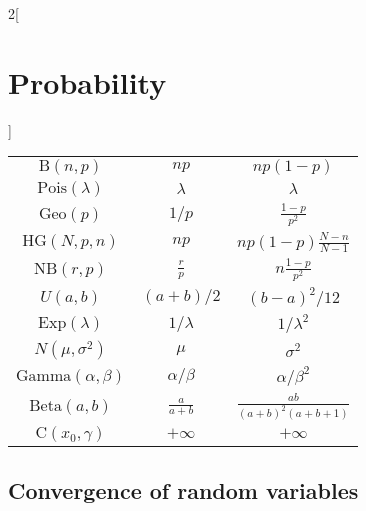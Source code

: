 \documentclass[../../../main_math.tex]{subfiles}
\begin{document}
\begin{multicols}{2}[\section{Probability}]
\begin{center}
\begin{tabular}{|c|c|c|}
      $\text{B}(n,p)$              & $\displaystyle np$            & $\displaystyle np(1-p)$                     \\
      $\text{Pois}(\lambda)$       & $\displaystyle \lambda$       & $\displaystyle \lambda$                     \\
      $\text{Geo}(p)$              & $\displaystyle 1/p$           & $\displaystyle \frac{1-p}{p^2}$             \\
      $\text{HG}(N,p,n)$           & $\displaystyle np$            & $\displaystyle np(1-p)\frac{N-n}{N-1}$      \\
      $\text{NB}(r,p)$             & $\displaystyle \frac{r}{p}$   & $\displaystyle n\frac{1-p}{p^2}$            \\
      $U(a,b)$                     & $\displaystyle (a+b)/2$       & $\displaystyle {(b-a)}^2/12$                \\
      $\text{Exp}(\lambda)$        & $\displaystyle 1/\lambda$     & $\displaystyle 1/\lambda^2$                 \\
      $N(\mu,\sigma^2)$            & $\displaystyle \mu$           & $\displaystyle \sigma^2$                    \\
      $\text{Gamma}(\alpha,\beta)$ & $\displaystyle \alpha/\beta$  & $\displaystyle \alpha/\beta^2$              \\
      $\text{Beta}(a,b)$           & $\displaystyle \frac{a}{a+b}$ & $\displaystyle \frac{ab}{{(a+b)}^2(a+b+1)}$ \\
      $\text{C}(x_0,\gamma)$       & $\displaystyle +\infty$       & $\displaystyle +\infty$                     \\
      \hline
    \end{tabular}
  \end{center}
  \subsection{Convergence of random variables}

\end{multicols}
\end{document}
